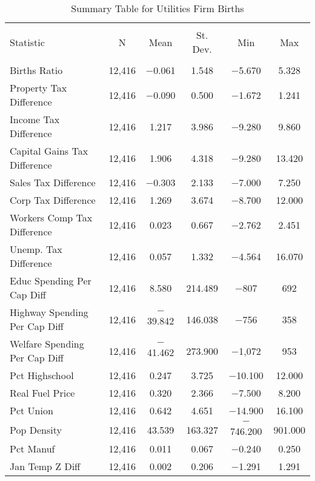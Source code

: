 
\begin{table}[!htbp] \centering 
  \caption{Summary Table for  Utilities Firm Births} 
  \label{22summary} 
\begin{tabular}{@{\extracolsep{5pt}}lccccc} 
\\[-1.8ex]\hline 
\hline \\[-1.8ex] 
Statistic & \multicolumn{1}{c}{N} & \multicolumn{1}{c}{Mean} & \multicolumn{1}{c}{St. Dev.} & \multicolumn{1}{c}{Min} & \multicolumn{1}{c}{Max} \\ 
\hline \\[-1.8ex] 
Births Ratio & 12,416 & $-$0.061 & 1.548 & $-$5.670 & 5.328 \\ 
Property Tax Difference & 12,416 & $-$0.090 & 0.500 & $-$1.672 & 1.241 \\ 
Income Tax Difference & 12,416 & 1.217 & 3.986 & $-$9.280 & 9.860 \\ 
Capital Gains Tax Difference & 12,416 & 1.906 & 4.318 & $-$9.280 & 13.420 \\ 
Sales Tax Difference & 12,416 & $-$0.303 & 2.133 & $-$7.000 & 7.250 \\ 
Corp Tax Difference & 12,416 & 1.269 & 3.674 & $-$8.700 & 12.000 \\ 
Workers Comp Tax Difference & 12,416 & 0.023 & 0.667 & $-$2.762 & 2.451 \\ 
Unemp. Tax Difference & 12,416 & 0.057 & 1.332 & $-$4.564 & 16.070 \\ 
Educ Spending Per Cap Diff & 12,416 & 8.580 & 214.489 & $-$807 & 692 \\ 
Highway Spending Per Cap Diff & 12,416 & $-$39.842 & 146.038 & $-$756 & 358 \\ 
Welfare Spending Per Cap Diff & 12,416 & $-$41.462 & 273.900 & $-$1,072 & 953 \\ 
Pct Highschool & 12,416 & 0.247 & 3.725 & $-$10.100 & 12.000 \\ 
Real Fuel Price & 12,416 & 0.320 & 2.366 & $-$7.500 & 8.200 \\ 
Pct Union & 12,416 & 0.642 & 4.651 & $-$14.900 & 16.100 \\ 
Pop Density & 12,416 & 43.539 & 163.327 & $-$746.200 & 901.000 \\ 
Pct Manuf & 12,416 & 0.011 & 0.067 & $-$0.240 & 0.250 \\ 
Jan Temp Z Diff & 12,416 & 0.002 & 0.206 & $-$1.291 & 1.291 \\ 

\end{tabular}
\end{table}
